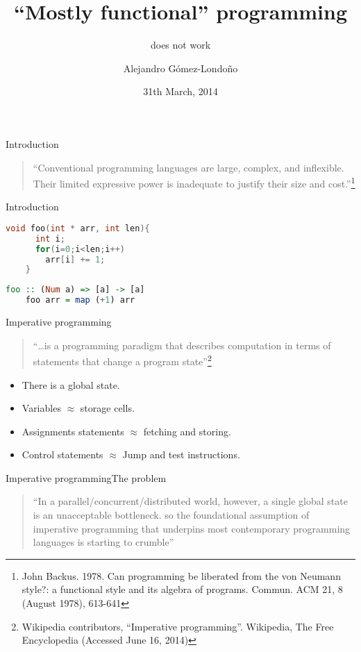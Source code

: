 \documentclass[rail]{beamer}
\title{``Mostly functional'' programming}
\subtitle{does not work}
\author{Alejandro Gómez-Londoño}
\date{31th March, 2014}
\institute{EAFIT University}
\begin{document}
\begin{frame}
  \titlepage
\end{frame}

\begin{frame}{Introduction}
  \begin{quote}
    ``Conventional programming languages are large, complex, and
    inflexible. Their limited expressive power is inadequate to
    justify their size and cost.''\footnote[frame,1] {John
      Backus. 1978. Can programming be liberated from the von Neumann
      style?: a functional style and its algebra of
      programs. Commun. ACM 21, 8 (August 1978), 613-641}
  \end{quote}
\end{frame}

\begin{frame}[fragile]{Introduction}

  \begin{lstlisting}[language=C]
    void foo(int * arr, int len){
      int i;
      for(i=0;i<len;i++)
        arr[i] += 1;
    }
  \end{lstlisting}
  \pause
  \begin{lstlisting}[language=Haskell]
    foo :: (Num a) => [a] -> [a]
    foo arr = map (+1) arr
  \end{lstlisting}
\end{frame}

\begin{frame}{Imperative programming}
  \begin{quote}
    ``\dots is a programming paradigm that describes computation in terms
    of statements that change a program state''\footnote[frame,1]
    {Wikipedia contributors, ``Imperative programming''.
      Wikipedia, The Free Encyclopedia (Accessed June 16, 2014)}
  \end{quote}
  \pause
  \begin{itemize}[<+->]
  \item There is a global state.
  \item Variables $\approx$ storage cells.
  \item Assignments statements $\approx$ fetching and storing.
  \item Control statements $\approx$ Jump and test instructions.
  \end{itemize}
\end{frame}

\begin{frame}{Imperative programming}{The problem}
  \begin{quote}
    ``In a parallel/concurrent/distributed world, however, a single
    global state is an unacceptable bottleneck. so the foundational
    assumption of imperative programming that underpins most
    contemporary programming languages is starting to crumble''
  \end{quote}

\end{frame}
\end{document}
